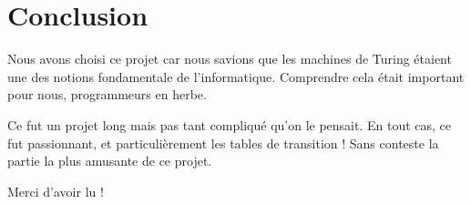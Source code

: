 \documentclass[a4paper,10pt, parskip=true]{scrartcl}
\begin{document}
\section{Conclusion}
    Nous avons choisi ce projet car nous savions que les machines de Turing étaient une des notions fondamentale de l'informatique. Comprendre cela était important pour nous, programmeurs en herbe.
    
    Ce fut un projet long mais pas tant compliqué qu'on le pensait. En tout cas, ce fut passionnant, et particulièrement les tables de transition ! Sans conteste la partie la plus amusante de ce projet.
    
    Merci d'avoir lu !
    
    
\end{document}
